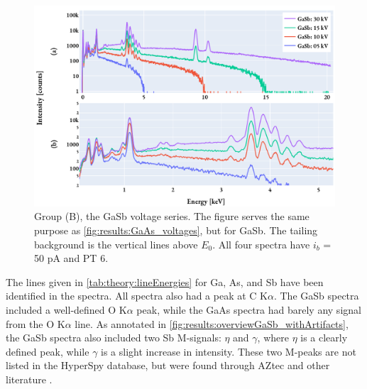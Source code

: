 \begin{figure}[hbtp]
    \centering
    \includegraphics[width=0.85\linewidth]{figures/results/GaSb_voltages.pdf}
    \caption{
        Group (B), the GaSb voltage series.
        The figure serves the same purpose as \cref{fig:results:GaAs_voltages}, but for GaSb.
        The tailing background is the vertical lines above $E_0$.
        All four spectra have $i_b$ = 50 pA and PT 6.
    }
    \label{fig:results:GaSb_voltages}
\end{figure}






The lines given in \cref{tab:theory:lineEnergies} for Ga, As, and Sb have been identified in the spectra.
All spectra also had a peak at C K$\alpha$.
The GaSb spectra included a well-defined O K$\alpha$ peak, while the GaAs spectra had barely any signal from the O K$\alpha$ line.
As annotated in \cref{fig:results:overviewGaSb_withArtifacts}, the GaSb spectra also included two Sb M-signals: $\eta$ and $\gamma$, where $\eta$ is a clearly defined peak, while $\gamma$ is a slight increase in intensity.
These two M-peaks are not listed in the HyperSpy database, but were found through AZtec \cite{aztec_manual} and other literature \cite{liao2006practical}.



